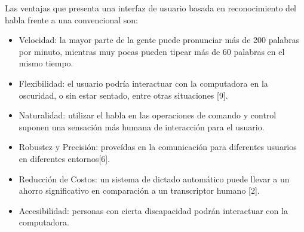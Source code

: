 Las ventajas que presenta una interfaz de usuario basada en reconocimiento del habla 
frente a una convencional son:

\begin{itemize}
    \item Velocidad: la mayor parte de la gente puede pronunciar m\'{a}s de 200 palabras por minuto, 
    mientras muy pocas pueden tipear m\'{a}s de 60 palabras en el mismo tiempo.

    \item Flexibilidad: el usuario podr\'{i}a interactuar con la computadora en la oscuridad, 
    o sin estar sentado, entre otras situaciones [9].
    
    \item Naturalidad: utilizar el habla en las operaciones de comando y control suponen una 
    sensaci\'{o}n m\'{a}s humana de interacci\'{o}n para el usuario. 
    
    \item Robustez y Precisi\'{o}n: prove\'{i}das en la comunicaci\'{o}n para diferentes usuarios 
    en diferentes entornos[6].
    
    \item Reducci\'{o}n de Costos: un sistema de dictado autom\'{a}tico puede llevar a un ahorro 
    significativo en comparaci\'{o}n a un transcriptor humano [2].
    
    \item Accesibilidad: personas con cierta discapacidad podr\'{a}n interactuar con la computadora.
\end{itemize}